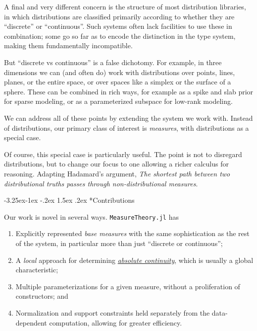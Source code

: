 \documentclass{juliacon}
\makeatletter
\renewcommand\subsection{\@startsection{subsection}{2}{\z@}%
{-3.25ex\@plus -1ex \@minus -.2ex}%
{1.5ex \@plus .2ex}%
{\normalfont\bfseries}}
\makeatother
\begin{document}
A final and very different concern is the structure of most distribution libraries, in which distributions are classified primarily according to whether they are ``discrete'' or ``continuous''. Such systems often lack facilities to use these in combination; some go so far as to encode the distinction in the type system, making them fundamentally incompatible.

But ``discrete vs continuous'' is a false dichotomy. For example, in three dimensions we can (and often do) work with distributions over points, lines, planes, or the entire space, or over spaces like a simplex or the surface of a  sphere. These can be combined in rich ways, for example as a spike and slab prior for sparse modeling, or as a parameterized subspace for low-rank modeling.

We can address all of these points by extending the system we work with. Instead of distributions, our primary class of interest is \emph{measures}, with distributions as a special case.

Of course, this special case is particularly useful. The point is not to disregard distributions, but to change our focus to one allowing a richer calculus for reasoning. Adapting Hadamard's argument, 
\emph{The shortest path between two distributional truths passes through  non-distributional measures}.    


\subsection*{Contributions}

Our work is novel in several ways. \verb|MeasureTheory.jl| has
\begin{enumerate}
    \item Explicitly represented \emph{base measures} with the same sophistication as the rest of the system, in particular more than just ``discrete or continuous'';
    \item A \emph{local} approach for determining \href{https://en.wikipedia.org/wiki/Absolute_continuity}{\emph{absolute continuity}}, which is usually a global characteristic;
    \item Multiple parameterizations for a given measure, without a proliferation of constructors; and
    \item Normalization and support constraints held separately from the data-dependent computation, allowing for greater efficiency.
\end{enumerate}
\end{document}
